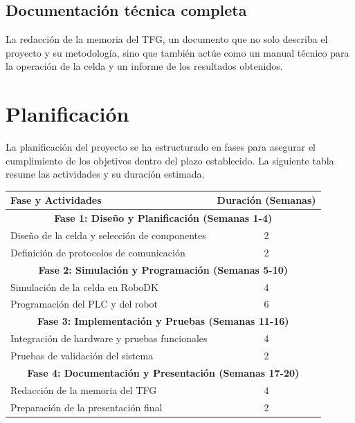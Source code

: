 \documentclass[12pt, a4paper]{article}
\begin{document}
\subsection{Documentación técnica completa}
La redacción de la memoria del TFG, un documento que no solo describa el proyecto y su metodología, sino que también actúe como un manual técnico para la operación de la celda y un informe de los resultados obtenidos.


\section{Planificación}
La planificación del proyecto se ha estructurado en fases para asegurar el cumplimiento de los objetivos dentro del plazo establecido. La siguiente tabla resume las actividades y su duración estimada.

\begin{center}
\begin{tabular}{|l|c|}
\hline
\textbf{Fase y Actividades} & \textbf{Duración (Semanas)} \\
\hline
\multicolumn{2}{|c|}{\textbf{Fase 1: Diseño y Planificación (Semanas 1-4)}} \\
\hline
Diseño de la celda y selección de componentes & 2 \\
Definición de protocolos de comunicación & 2 \\
\hline
\multicolumn{2}{|c|}{\textbf{Fase 2: Simulación y Programación (Semanas 5-10)}} \\
\hline
Simulación de la celda en RoboDK & 4 \\
Programación del PLC y del robot & 6 \\
\hline
\multicolumn{2}{|c|}{\textbf{Fase 3: Implementación y Pruebas (Semanas 11-16)}} \\
\hline
Integración de hardware y pruebas funcionales & 4 \\
Pruebas de validación del sistema & 2 \\
\hline
\multicolumn{2}{|c|}{\textbf{Fase 4: Documentación y Presentación (Semanas 17-20)}} \\
\hline
Redacción de la memoria del TFG & 4 \\
Preparación de la presentación final & 2 \\
\hline
\end{tabular}
\end{center}
\end{document}
